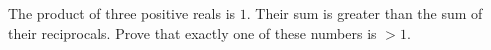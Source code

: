 The product of three positive reals is $1$. Their sum is greater than the sum of their reciprocals. Prove that exactly one of these numbers is $> 1$.
